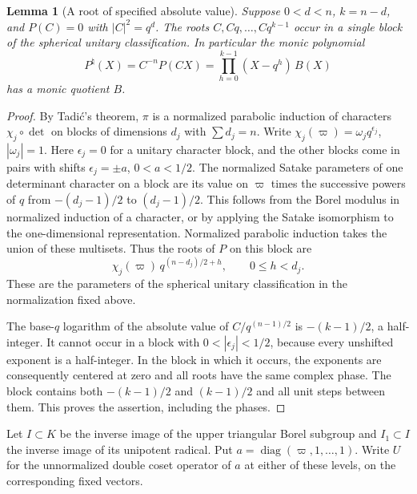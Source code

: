 \documentclass[a4paper,11pt]{article}
\newtheorem{lemma}[proposition]{Lemma}
\theoremstyle{definition}
\theoremstyle{remark}
\numberwithin{equation}{section}
\begin{document}
\begin{lemma}[A root of specified absolute value]\leavevmode
\label{lem:sphericalchain716}
Suppose \(0<d<n\), \(k=n-d\), and \(P(C)=0\) with
\(|C|^2=q^d\). The roots \(C,Cq,\ldots,Cq^{k-1}\) occur in
a single block of the spherical unitary classification.
In particular the monic polynomial
\[
             P^\natural(X)=C^{-n}P(CX)
                =\prod_{h=0}^{k-1}(X-q^h)\, B(X)
\]
has a monic quotient \(B\).
\end{lemma}
\begin{proof}
By Tadi\'c's theorem, \(\pi\) is a normalized parabolic
induction of characters \(\chi_j\circ\det\) on blocks of
dimensions \(d_j\) with \(\sum d_j=n\). Write
\(\chi_j(\varpi)=\omega_j q^{\epsilon_j}\), \(|\omega_j|=1\).
Here \(\epsilon_j=0\) for a unitary character block, and the
other blocks come in pairs with shifts \(\epsilon_j=\pm a\),
\(0<a<1/2\). The normalized Satake parameters of one determinant
character on a block are its value on \(\varpi\) times the
successive powers of \(q\) from \(-(d_j-1)/2\) to \((d_j-1)/2\).
This follows from the Borel modulus in normalized induction
of a character, or by applying the Satake isomorphism to the
one-dimensional representation. Normalized parabolic induction
takes the union of these multisets. Thus the roots of \(P\) on
this block are
\[
        \chi_j(\varpi)\,q^{(n-d_j)/2+h},\qquad 0\le h<d_j .
\]
These are the parameters of the spherical unitary classification
in the normalization fixed above.~\cite[Theorem 3.2]{IX-VII-VII-tadicsph716}

The base-\(q\) logarithm of the absolute value of
\(C/q^{(n-1)/2}\) is \(-(k-1)/2\), a half-integer. It cannot
occur in a block with \(0<|\epsilon_j|<1/2\), because every
unshifted exponent is a half-integer. In the block in which
it occurs, the exponents are consequently centered at zero
and all roots have the same complex phase. The block contains
both \(-(k-1)/2\) and \((k-1)/2\) and all unit steps between
them. This proves the assertion, including the phases.
\end{proof}

Let \(I\subset K\) be the inverse image of the upper triangular
Borel subgroup and \(I_1\subset I\) the inverse image of its
unipotent radical. Put \(a=\operatorname{diag}(\varpi,1,\ldots,1)\).
Write \(U\) for the unnormalized double coset operator of \(a\)
at either of these levels, on the corresponding fixed vectors.
\end{document}
